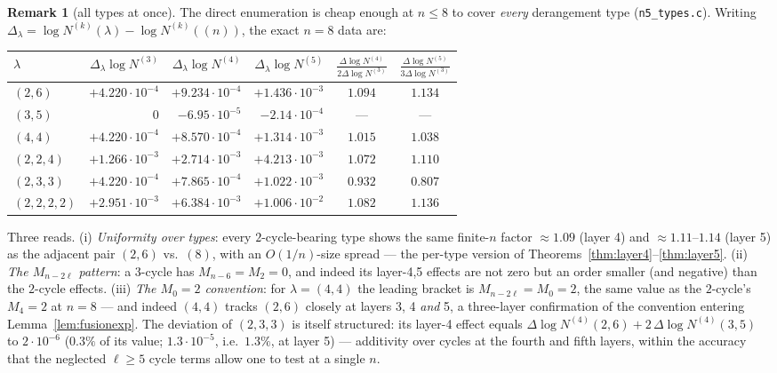 \documentclass[11pt]{article}
\theoremstyle{definition}
\newtheorem{remark}[theorem]{Remark}
\begin{document}
\begin{remark}[all types at once]\label{rem:alltypes}
The direct enumeration is cheap enough at $n\le8$ to cover \emph{every}
derangement type (\texttt{n5\_types.c}).  Writing
$\Delta_\lambda=\log N^{(k)}(\lambda)-\log N^{(k)}((n))$, the exact
$n=8$ data are:
\begin{center}
\begin{tabular}{l|rrr|cc}
$\lambda$ & $\Delta_\lambda\log N^{(3)}$ & $\Delta_\lambda\log N^{(4)}$
& $\Delta_\lambda\log N^{(5)}$ &
$\frac{\Delta\log N^{(4)}}{2\Delta\log N^{(3)}}$ &
$\frac{\Delta\log N^{(5)}}{3\Delta\log N^{(3)}}$\\\hline
$(2,6)$ & $+4.220\cdot10^{-4}$ & $+9.234\cdot10^{-4}$ & $+1.436\cdot10^{-3}$ & $1.094$ & $1.134$\\
$(3,5)$ & $0$ & $-6.95\cdot10^{-5}$ & $-2.14\cdot10^{-4}$ & --- & ---\\
$(4,4)$ & $+4.220\cdot10^{-4}$ & $+8.570\cdot10^{-4}$ & $+1.314\cdot10^{-3}$ & $1.015$ & $1.038$\\
$(2,2,4)$ & $+1.266\cdot10^{-3}$ & $+2.714\cdot10^{-3}$ & $+4.213\cdot10^{-3}$ & $1.072$ & $1.110$\\
$(2,3,3)$ & $+4.220\cdot10^{-4}$ & $+7.865\cdot10^{-4}$ & $+1.022\cdot10^{-3}$ & $0.932$ & $0.807$\\
$(2,2,2,2)$ & $+2.951\cdot10^{-3}$ & $+6.384\cdot10^{-3}$ & $+1.006\cdot10^{-2}$ & $1.082$ & $1.136$\\
\end{tabular}
\end{center}
Three reads.  (i) \emph{Uniformity over types}: every $2$-cycle-bearing
type shows the same finite-$n$ factor $\approx1.09$ (layer 4) and
$\approx1.11\text{--}1.14$ (layer 5) as the adjacent pair
$(2,6)$ vs.\ $(8)$, with an $O(1/n)$-size spread --- the per-type version
of Theorems~\ref{thm:layer4}--\ref{thm:layer5}.  (ii) \emph{The
$M_{n-2\ell}$ pattern}: a $3$-cycle has $M_{n-6}=M_2=0$, and indeed its
layer-4,5 effects are not zero but an order smaller (and negative) than
the $2$-cycle effects.  (iii) \emph{The $M_0=2$ convention}: for
$\lambda=(4,4)$ the leading bracket is $M_{n-2\ell}=M_0=2$, the same
value as the $2$-cycle's $M_4=2$ at $n=8$ --- and indeed $(4,4)$ tracks
$(2,6)$ closely at layers 3, 4 \emph{and} 5, a three-layer confirmation
of the convention entering Lemma~\ref{lem:fusionexp}.  The deviation of
$(2,3,3)$ is itself structured: its layer-4 effect equals
$\Delta\log N^{(4)}(2,6)+2\,\Delta\log N^{(4)}(3,5)$ to $2\cdot10^{-6}$
($0.3\%$ of its value; $1.3\cdot10^{-5}$, i.e.\ $1.3\%$, at layer 5) ---
additivity over cycles at the fourth and fifth layers, within the
accuracy that the neglected $\ell\ge5$ cycle terms allow one to test at
a single $n$.
\end{remark}
\end{document}
